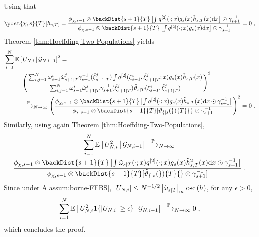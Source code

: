 Using that
\begin{equation*}
\post{\Xinit,s}{T}[\tilde{h}_{s,T}]= \frac{\filt{\Xinit,s-1} \otimes \backDist{s+1}{T}\left[ \int q^{[2]}(\cdot;x) g_s(x) \tilde{h}_{s,T}(x) \rmd x\right] \odot \gamma_{s+1}^{-1}}
{\filt{\Xinit,s-1} \otimes \backDist{s+1}{T}\left[ \int q^{[2]}(\cdot;x) g_s(x)\rmd x\right] \odot \gamma_{s+1}^{-1} }= 0 \eqsp,
\end{equation*}
Theorem \ref{thm:Hoeffding-Two-Populations} yields
\begin{align*}
&\sum_{i=1}^N\CPE{U_{N,i}}{\mcg{N,i-1}}^2 = \\
&\hspace{1cm}\left(\frac{\sum_{i,j=1}^N \ewght{s-1}{i} \ebackwght{s+1}{T}{j} \fakeprior_{s+1}^{-1}(\ebackpart{s+1}{T}{j}) \int q^{[2]}(\epart{s-1}{i},\ebackpart{s+1}{T}{j}; x) g_s(x) \tilde{h}_{s,T}(x)}
{\sum_{i,j=1}^N \ewght{s-1}{i} \ebackwght{s+1}{T}{j} \fakeprior_{s+1}^{-1}(\ebackpart{s+1}{T}{j}) \adjfunc[smooth]{s}{T}{\epart{s-1}{i},\ebackpart{s+1}{T}{j}}} \right)^2\\
&\hspace{1cm}\plim_{N \to \infty} \left( \frac{\filt{\Xinit,s-1} \otimes \backDist{s+1}{T}\left[ \int q^{[2]}(\cdot;x) g_s(x) \tilde{h}_{s,T}(x) \rmd x\odot \fakeprior_{s+1}^{-1}\right]}
{\filt{\Xinit,s-1} \otimes \backDist{s+1}{T} [\adjfunc[smooth]{s}{T}{} \odot \fakeprior_{s+1}^{-1}]} \right)^2 = 0 \eqsp.
\end{align*}
Similarly, using again Theorem \ref{thm:Hoeffding-Two-Populations},
\begin{multline*}
\sum_{i=1}^N \CPE{U_{N,i}^2}{\mcg{N,i-1}} \plim_{N \to \infty} \\
\frac{\filt{\Xinit,s-1} \otimes \backDist{s+1}{T}\left[ \int \smwghtfunc{s}{T}(\cdot;x) q^{[2]}(\cdot;x) g_s(x) \tilde{h}_{s,T}^2(x) \rmd x \odot \fakeprior_{s+1}^{-1}\right]}
{\filt{\Xinit,s-1} \otimes \backDist{s+1}{T} [\adjfunc[smooth]{s}{T}{} \odot \fakeprior_{s+1}^{-1}]} \eqsp.
\end{multline*}
Since under A\ref{assum:borne-FFBS}, $|U_{N,i}| \leq N^{-1/2} \esssup{\smwghtfunc{s}{T}} \oscnorm{h}$, for any $\epsilon > 0$, $$\sum_{i=1}^N \CPE{U^2_{N,i} \1 \{ |U_{N,i}| \geq \epsilon \}}{\mcg{N,i-1}} \plim_{N \to \infty} 0 \eqsp,$$
which concludes the proof.

